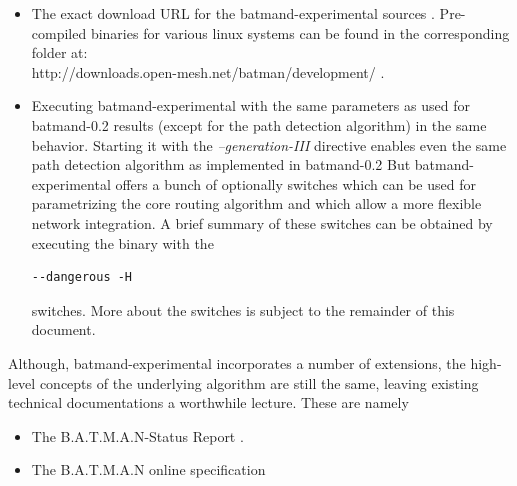 \documentclass[11pt]{article}
\begin{document}
\begin{itemize}
 \item The exact download URL for the batmand-experimental sources \cite{bmx-source-url}.
Pre-compiled binaries for various linux systems can be found in the corresponding folder at:\\
http://downloads.open-mesh.net/batman/development/ .


\item Executing batmand-experimental with the same parameters as used for batmand-0.2 results (except for the path detection algorithm) in the same behavior.
%
Starting it with the \emph{--generation-III} directive enables even the same path detection algorithm as implemented in batmand-0.2
%
%
But batmand-experimental offers a bunch of optionally switches which can be used for parametrizing the core routing algorithm and which allow a more flexible network integration. A brief summary of these switches can be obtained by executing the binary with the
%
\begin{small}
\begin{verbatim}
--dangerous -H
\end{verbatim}
\end{small}
%
 switches. More about the switches is subject to the remainder of this document.



\end{itemize}
%
Although, batmand-experimental incorporates a number of extensions, the high-level concepts of the underlying algorithm are still the same, leaving existing technical documentations a worthwhile lecture. These are namely
\begin{itemize}
 \item The B.A.T.M.A.N-Status Report \cite{batman-status-report}.
 \item The B.A.T.M.A.N online specification \cite{batman-specification-wiki}
\end{itemize}
\end{document}
